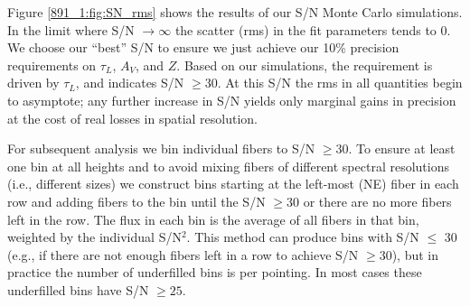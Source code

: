 %
% 
% 
% 
% 
% 
%  
%

Figure \ref{891_1:fig:SN_rms} shows the results of our S/N Monte Carlo
simulations. In the limit where S/N $\rightarrow\infty$ the scatter
(rms) in the fit parameters tends to 0.  We choose our ``best'' S/N to
ensure we just achieve our 10\% precision requirements on $\tau_L$,
$A_V$, and $Z$.  Based on our simulations, the requirement is driven
by $\tau_L$, and indicates S/N $\geq 30$.  At this S/N the rms in all
quantities begin to asymptote; any further increase in S/N yields only
marginal gains in precision at the cost of real losses in spatial
resolution.

For subsequent analysis we bin individual \GP fibers to S/N $\geq
30$. To ensure at least one bin at all heights and to avoid mixing
fibers of different spectral resolutions (i.e., different sizes) we
construct bins starting at the left-most (NE) fiber in each row and
adding fibers to the bin until the S/N $\geq 30$ or there are no more
fibers left in the row. The flux in each bin is the average of all
fibers in that bin, weighted by the individual S/N$^2$. This method
can produce bins with S/N $\leq$ 30 (e.g., if there are not enough
fibers left in a row to achieve S/N $\geq 30$), but in practice the
number of underfilled bins is  per pointing. In most cases
these underfilled bins have S/N $\geq 25$.

